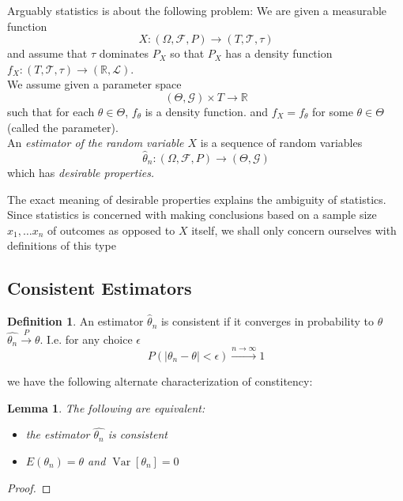 \documentclass{book}
\theoremstyle{plain}
\newtheorem{lemma}[corollary]{Lemma}
\theoremstyle{definition}
\newtheorem{definition}[corollary]{Definition}
\renewcommand{\d}[1]{\mathbb{#1}}
\newcommand{\mor}{\longrightarrow}
\renewcommand{\r}[1]{\mathcal{#1}}
\DeclareMathOperator{\Var}{Var}
\begin{document}
Arguably statistics is about the following problem: We are given a measurable function
\[
X:(\Omega, \r{F}, P)\mor (T,\r{T},\tau)
\]
and assume that $\tau$ dominates $P_X$ so that $P_X$ has a density function $f_X: (T,\r{T},\tau) \mor (\d{R},\r{L})$.\\
We assume given a parameter space
\[
(\Theta, \r{G})\times T\mor \d{R}
\]
such that for each $\theta \in \Theta$, $f_\theta$ is a density function. and $f_X=f_\theta$ for some $\theta \in \Theta$ (called the parameter).\\
An \emph{estimator of the random variable $X$} is a sequence of random variables
\[
\hat{\theta}_n:(\Omega,\r{F},P)\mor (\Theta, \r{G})
\] 
which has \emph{desirable properties.}
\begin{center}
The exact meaning of desirable properties explains the ambiguity of statistics. Since statistics is concerned with making conclusions based on a sample size $x_1,\ldots x_n$ of outcomes as opposed to $X$ itself, we shall only concern ourselves with definitions of this type
\end{center}
 
 
\subsection{Consistent Estimators}

\begin{definition}
An estimator $\hat{\theta}_n$ is consistent if it converges in probability to $\theta$ $\hat{\theta_n}\stackrel{P}{\mor} \theta$. I.e. for any choice $\epsilon$
\[
P(\vert \theta_n-\theta\vert <\epsilon)\stackrel{n\to \infty}{\mor} 1
\]
\end{definition}

we have the following alternate characterization of constitency:

\begin{lemma}
The following are equivalent:
\begin{itemize}
\item the estimator $\hat{\theta_n}$ is consistent
\item $E(\theta_n)=\theta$ and $\Var[\theta_n]=0$	
\end{itemize}
\end{lemma}

\begin{proof}
	
\end{proof}
 
 
\end{document}
